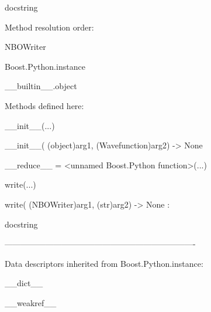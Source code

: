 \documentclass[letterpaper,10pt,english]{sphinxmanual}
\begin{document}
\begin{description}
\begin{description}
\item[{class NBOWriter(Boost.Python.instance)}] \leavevmode
\begin{DUlineblock}{0em}
\item[] docstring
\item[] 
\item[] Method resolution order:
\item[]
\begin{DUlineblock}{\DUlineblockindent}
\item[] NBOWriter
\item[] Boost.Python.instance
\item[] \_\_builtin\_\_.object
\item[] 
\end{DUlineblock}
\item[] Methods defined here:
\item[] 
\item[] \_\_init\_\_(...)
\item[]
\begin{DUlineblock}{\DUlineblockindent}
\item[] \_\_init\_\_( (object)arg1, (Wavefunction)arg2) -\textgreater{} None
\item[] 
\end{DUlineblock}
\item[] \_\_reduce\_\_ = \textless{}unnamed Boost.Python function\textgreater{}(...)
\item[] 
\item[] write(...)
\item[]
\begin{DUlineblock}{\DUlineblockindent}
\item[] write( (NBOWriter)arg1, (str)arg2) -\textgreater{} None :
\item[]
\begin{DUlineblock}{\DUlineblockindent}
\item[] docstring
\item[] 
\end{DUlineblock}
\end{DUlineblock}
\item[] ----------------------------------------------------------------------
\item[] Data descriptors inherited from Boost.Python.instance:
\item[] 
\item[] \_\_dict\_\_
\item[] 
\item[] \_\_weakref\_\_
\item[] 

\end{DUlineblock}
\end{description}
\end{description}
\end{document}
